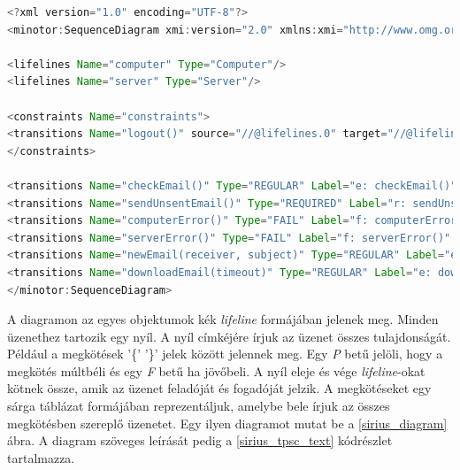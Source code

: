 \begin{lstlisting}[language=java, frame=single, float=ht!, caption={Szenárió diagram xml leírása.},captionpos=b, label=sirius_xml]
<?xml version="1.0" encoding="UTF-8"?>
<minotor:SequenceDiagram xmi:version="2.0" xmlns:xmi="http://www.omg.org/XMI" xmlns:minotor="hu.bme.mit.mdsd.xboyz.erdiagram" Name="Email">

<lifelines Name="computer" Type="Computer"/>
<lifelines Name="server" Type="Server"/>

<constraints Name="constraints">
<transitions Name="logout()" source="//@lifelines.0" target="//@lifelines.1"/>
</constraints>

<transitions Name="checkEmail()" Type="REGULAR" Label="e: checkEmail()" source="//@lifelines.0" target="//@lifelines.0"  after="//@transitions.1" reset="x"/>
<transitions Name="sendUnsentEmail()" Type="REQUIRED" Label="r: sendUnsentEmail()" source="//@lifelines.0" target="//@lifelines.1" before="//@transitions.0" after="//@transitions.2"/>
<transitions Name="computerError()" Type="FAIL" Label="f: computerError()" source="//@lifelines.1" target="//@lifelines.0" before="//@transitions.1" after="//@transitions.3"/>
<transitions Name="serverError()" Type="FAIL" Label="f: serverError()" source="//@lifelines.0" target="//@lifelines.1" before="//@transitions.2" after="//@transitions.4"/>
<transitions Name="newEmail(receiver, subject)" Type="REGULAR" Label="e: newEmail(receiver, subject)" source="//@lifelines.0" target="//@lifelines.1" before="//@transitions.3" after="//@transitions.5" constraint="//@constraints.0" constraintType="PAST"/>
<transitions Name="downloadEmail(timeout)" Type="REGULAR" Label="e: downloadEmail(timeout)" source="//@lifelines.0" target="//@lifelines.1" before="//@transitions.4"   clockConstraint="x &gt; 10"/>
</minotor:SequenceDiagram>
\end{lstlisting}

A diagramon az egyes objektumok kék \textit{lifeline} formájában jelenek meg.
Minden üzenethez tartozik egy nyíl.
A nyíl címkéjére írjuk az üzenet összes tulajdonságát.
Például a megkötések '\{' '\}' jelek között jelennek meg.
Egy \textit{P} betű jelöli, hogy a megkötés múltbéli és egy \textit{F} betű ha jövőbeli.
A nyíl eleje és vége \textit{lifeline}-okat kötnek össze, amik az üzenet feladóját és fogadóját jelzik.
A megkötéseket egy sárga táblázat formájában reprezentáljuk, amelybe bele írjuk az összes megkötésben szereplő üzenetet.
Egy ilyen diagramot mutat be a \ref{sirius_diagram} ábra.
A diagram szöveges leírását pedig a \ref{sirius_tpsc_text} kódrészlet tartalmazza.

